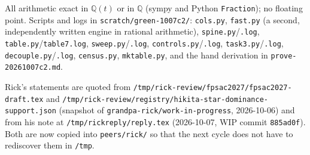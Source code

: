 \documentclass[11pt]{article}
\theoremstyle{definition}
\newcommand{\QQ}{\mathbb{Q}}
\begin{document}
All arithmetic exact in $\QQ(t)$ or in $\QQ$ (sympy and Python \texttt{Fraction}); no floating
point. Scripts and logs in \texttt{scratch/green-1007c2/}: \texttt{cols.py}, \texttt{fast.py}
(a second, independently written engine in rational arithmetic), \texttt{spine.py}/\texttt{.log},
\texttt{table.py}/\texttt{table7.log}, \texttt{sweep.py}/\texttt{.log},
\texttt{controls.py}/\texttt{.log}, \texttt{task3.py}/\texttt{.log},
\texttt{decouple.py}/\texttt{.log}, \texttt{census.py}, \texttt{mktable.py}, and the hand
derivation in \texttt{prove-20261007c2.md}.

Rick's statements are quoted from \texttt{/tmp/rick-review/fpsac2027/fpsac2027-draft.tex} and
\texttt{/tmp/rick-review/registry/hikita-star-dominance-support.json} (snapshot of
\texttt{grandpa-rick/work-in-progress}, 2026-10-06) and from his note at
\texttt{/tmp/rickreply/reply.tex} (2026-10-07, WIP commit \texttt{885ad0f}). Both are now copied
into \texttt{peers/rick/} so that the next cycle does not have to rediscover them in \texttt{/tmp}.
\end{document}
